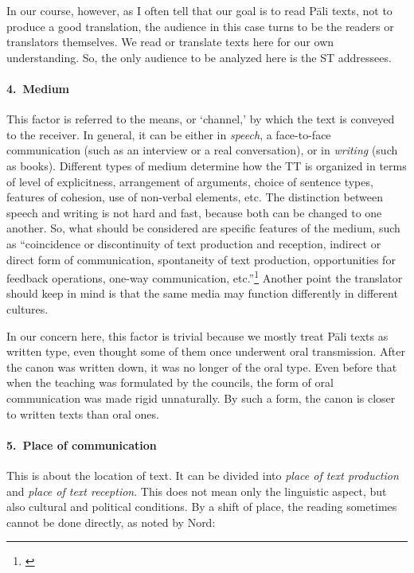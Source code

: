 In our course, however, as I often tell that our goal is to read P\=ali texts, not to produce a good translation, the audience in this case turns to be the readers or translators themselves. We read or translate texts here for our own understanding. So, the only audience to be analyzed here is the ST addressees. 

\paragraph*{4.\ Medium} This factor is referred to the means, or `channel,' by which the text is conveyed to the receiver. In general, it can be either in \emph{speech}, a face-to-face communication (such as an interview or a real conversation), or in \emph{writing} (such as books). Different types of medium determine how the TT is organized in terms of level of explicitness, arrangement of arguments, choice of sentence types, features of cohesion, use of non-verbal elements, etc. The distinction between speech and writing is not hard and fast, because both can be changed to one another. So, what should be considered are specific features of the medium, such as ``coincidence or discontinuity of text production and reception, indirect or direct form of communication, spontaneity of text production, opportunities for feedback operations, one-way communication, etc.''\footnote{\citealp[p.~63]{nord:analysis}} Another point the translator should keep in mind is that the same media may function differently in different cultures.

In our concern here, this factor is trivial because we mostly treat P\=ali texts as written type, even thought some of them once underwent oral transmission. After the canon was written down, it was no longer of the oral type. Even before that when the teaching was formulated by the councils, the form of oral communication was made rigid unnaturally. By such a form, the canon is closer to written texts than oral ones.

\paragraph*{5.\ Place of communication} This is about the location of text. It can be divided into \emph{place of text production} and \emph{place of text reception}. This does not mean only the linguistic aspect, but also cultural and political conditions. By a shift of place, the reading sometimes cannot be done directly, as noted by Nord:

